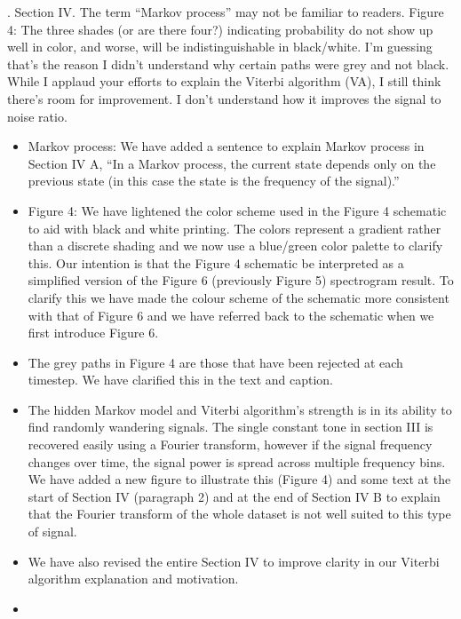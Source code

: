\documentclass{article}
\begin{document}
. Section IV.  The term “Markov process” may not be familiar to readers.  Figure 4: The three shades (or are there four?) indicating probability do not show up well in color, and worse, will be indistinguishable in black/white.  I’m guessing that’s the reason I didn’t understand why certain paths were grey and not black.  While I applaud your efforts to explain the Viterbi algorithm (VA), I still think there’s room for improvement.  I don’t understand how it improves the signal to noise ratio. 
\begin{itemize}
\item Markov process: We have added a sentence to explain Markov process in Section IV A, ``In a Markov process, the current state depends only on the previous state (in this case the state is the frequency of the signal).''
\item Figure 4: We have lightened the color scheme used in the Figure 4 schematic to aid with black and white printing. The colors represent a gradient rather than a discrete shading and we now use a blue/green color palette to clarify this. Our intention is that the Figure 4 schematic be interpreted as a simplified version of the Figure 6 (previously Figure 5) spectrogram result. To clarify this we have made the colour scheme of the schematic more consistent with that of Figure 6 and we have referred back to the schematic when we first introduce Figure 6. 
\item The grey paths in Figure 4 are those that have been rejected at each timestep. We have clarified this in the text and caption. 
\item The hidden Markov model and Viterbi algorithm's strength is in its ability to find randomly wandering signals. The single constant tone in section III is recovered easily using a Fourier transform, however if the signal frequency changes over time, the signal power is spread across multiple frequency bins. We have added a new figure to illustrate this (Figure 4) and some text at the start of Section IV (paragraph 2) and at the end of Section IV B to explain that the Fourier transform of the whole dataset is not well suited to this type of signal.
\item We have also revised the entire Section IV to improve clarity in our Viterbi algorithm explanation and motivation.
\item[]
\end{itemize}
\end{document}
